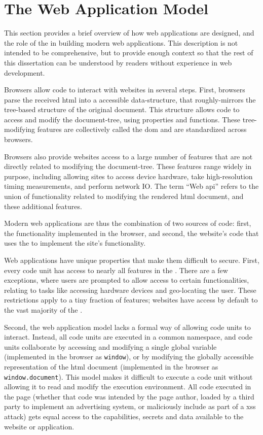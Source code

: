 \section{The Web Application Model}
\label{background:web-application-model}

This section provides a brief overview of how web applications are designed,
and the role of the \WAPI in building modern web applications.
This description is not intended to be comprehensive, but to provide enough
context so that the rest of this dissertation can be understood
by readers without experience in web development.

Browsers allow \JS code to interact with websites in several steps. First,
browsers parse the received \gls{html} into a \JS accessible data-structure,
that roughly-mirrors the tree-based structure of the original document.
This structure allows \JS code to access and modify the document-tree,
using \JS properties and functions.  These tree-modifying \JS features are
collectively called the \gls{dom} and are standardized across browsers.

Browsers also provide websites access to a large number of \JS features
that are not directly related to modifying the document-tree.  These
features range widely in purpose, including allowing sites to
access device hardware, take high-resolution timing measurements, and
perform network IO.  The term ``Web \gls{api}'' refers to the union of
functionality related to modifying the rendered \gls{html} document, and
these additional \JS features.

Modern web applications are thus the combination of two sources of code:
first, the \WAPI functionality implemented in the browser, and second,
the website's \JS code that uses the \WAPI to implement the site's functionality.

Web applications have unique properties that make them difficult to secure.
First, every \JS code unit has access to nearly all features in the \WAPI.
There are a few exceptions, where users are
prompted to allow access to certain functionalities, relating
to tasks like accessing hardware devices and geo-locating the user.  These
restrictions apply to a tiny fraction of features; websites have
access by default to the vast majority of the \WAPI.

Second, the web application model lacks a formal
way of allowing code units to interact.  Instead, all code units are
executed in a common namespace, and code units collaborate by accessing and
modifying a single global variable (implemented in the browser as
\texttt{window}), or by modifying the globally accessible representation of the
\gls{html} document (implemented in the browser as \texttt{window.document}).
This model makes it difficult to execute a code unit without allowing
it to read and modify the execution environment.  All code executed in the
page (whether that code was intended by the page author, loaded by a third
party to implement an advertising system, or maliciously include as part of
a \gls{xss} attack) gets equal access to the capabilities, secrets and data
available to the website or application.

